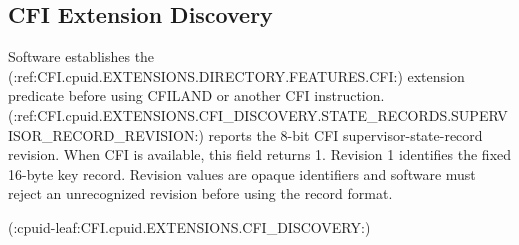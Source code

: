 \subsection{CFI Extension Discovery}\label{section:cfi-extension-discovery}
Software establishes the (:ref:CFI.cpuid.EXTENSIONS.DIRECTORY.FEATURES.CFI:) extension predicate before using CFILAND or another CFI instruction.
(:ref:CFI.cpuid.EXTENSIONS.CFI_DISCOVERY.STATE_RECORDS.SUPERVISOR_RECORD_REVISION:) reports the 8-bit CFI supervisor-state-record revision. When CFI is available, this field returns 1. Revision 1 identifies the fixed 16-byte key record. Revision values are opaque identifiers and software must reject an unrecognized revision before using the record format.

(:cpuid-leaf:CFI.cpuid.EXTENSIONS.CFI_DISCOVERY:)
